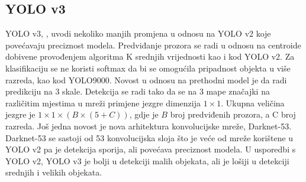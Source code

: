 \subsection{YOLO v3}
YOLO v3, \cite{DBLP:journals/corr/abs-1804-02767}, uvodi nekoliko manjih promjena u odnosu na YOLO v2 koje povećavaju preciznost modela.
Predviđanje prozora se radi u odnosu na centroide dobivene provođenjem algoritma K srednjih vrijednosti kao i kod YOLO v2. Za klasifikaciju se ne koristi softmax da bi se omogućila pripadnost objekta u više razreda, kao kod YOLO9000.
Novost u odnosu na prethodni model je da radi predikciju na 3 skale. Detekcija se radi tako da se na 3 mape značajki na različitim mjestima u mreži primjene jezgre dimenzija $1 \times 1$. Ukupna veličina jezgre je $1 \times 1 \times (B \times (5 + C))$, gdje je $B$ broj predviđenih prozora, a C broj razreda. Još jedna novost je nova arhitektura konvolucijske mreže, Darknet-53. Darknet-53 se sastoji od 53 konvolucijska sloja što je veće od mreže korištene u YOLO v2 pa je detekcija sporija, ali povećava preciznost modela. 
U usporedbi s YOLO v2, YOLO v3 je bolji u detekciji malih objekata, ali je lošiji u detekciji srednjih i velikih objekata.

 